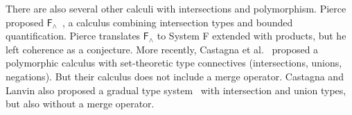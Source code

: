 There are also several other calculi with intersections and polymorphism. Pierce
proposed $\mathsf{F}_{\land}$~\cite{pierce1991programming}, a calculus combining
intersection types and bounded quantification. Pierce translates
$\mathsf{F}_{\land}$ to System F extended with products, but he left coherence
as a conjecture. More recently, Castagna et al.~\cite{castagna2014polymorphic}
proposed a polymorphic calculus with set-theoretic type connectives
(intersections, unions, negations). But their calculus does not include a merge
operator. Castagna and Lanvin also proposed a gradual type
system~\cite{Castagna_2017} with intersection and union types, but also without
a merge operator.





